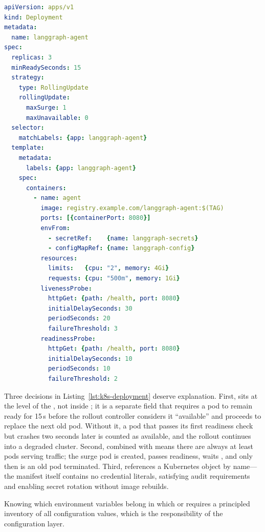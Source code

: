\begin{lstlisting}[language=yaml,
  caption={Kubernetes Deployment with rolling strategy ---
    \texttt{k8s/deployment.yaml} (key fields)},
  label={lst:k8s-deployment}]
apiVersion: apps/v1
kind: Deployment
metadata:
  name: langgraph-agent
spec:
  replicas: 3
  minReadySeconds: 15
  strategy:
    type: RollingUpdate
    rollingUpdate:
      maxSurge: 1
      maxUnavailable: 0
  selector:
    matchLabels: {app: langgraph-agent}
  template:
    metadata:
      labels: {app: langgraph-agent}
    spec:
      containers:
        - name: agent
          image: registry.example.com/langgraph-agent:$(TAG)
          ports: [{containerPort: 8080}]
          envFrom:
            - secretRef:    {name: langgraph-secrets}
            - configMapRef: {name: langgraph-config}
          resources:
            limits:   {cpu: "2", memory: 4Gi}
            requests: {cpu: "500m", memory: 1Gi}
          livenessProbe:
            httpGet: {path: /health, port: 8080}
            initialDelaySeconds: 30
            periodSeconds: 20
            failureThreshold: 3
          readinessProbe:
            httpGet: {path: /health, port: 8080}
            initialDelaySeconds: 10
            periodSeconds: 10
            failureThreshold: 2
\end{lstlisting}

Three decisions in Listing~\ref{lst:k8s-deployment} deserve explanation.
First,  sits at the  level of the
, not inside ; it is a separate field
that requires a pod to remain ready for 15\,s before the rollout controller
considers it ``available'' and proceeds to replace the next old pod. Without
it, a pod that passes its first readiness check but crashes two seconds later
is counted as available, and the rollout continues into a degraded cluster.
Second,  combined with  means
there are always at least  pods serving traffic; the surge pod
is created, passes readiness, waits , and only then is
an old pod terminated. Third,  references a
Kubernetes  object by name---the manifest itself contains no
credential literals, satisfying audit requirements and enabling secret
rotation without image rebuilds.

Knowing which environment variables belong in which  or
 requires a principled inventory of all configuration values,
which is the responsibility of the configuration layer.

